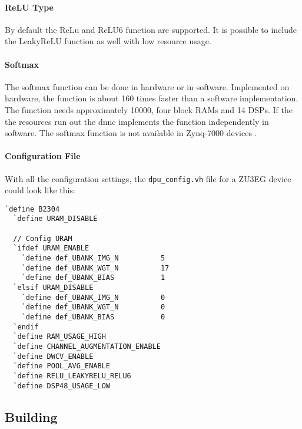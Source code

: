 \paragraph{ReLU Type}
By default the ReLu and ReLU6 function are supported.
It is possible to include the LeakyReLU function as well with low resource usage.

\paragraph{Softmax}
The softmax function can be done in hardware or in software.
Implemented on hardware, the function is about 160 times faster than a software implementation.
The function needs approximately \SI{10000}{}, four block RAMs and 14 DSPs.
If the the resources run out the \acrlong{dnnc} implements the function independently in software.
The softmax function is not available in Zynq-7000 devices \cite{dpu_product_guide}. 

\paragraph{Configuration File}
With all the configuration settings, the \texttt{dpu\_config.vh} file for a ZU3EG device could look like this:
\begin{lstlisting}[style=bash, caption={Configure \acrshort{dpu}}, label=lst:config_dpu]
  `define B2304
  `define URAM_DISABLE 

  // Config URAM
  `ifdef URAM_ENABLE
    `define def_UBANK_IMG_N          5
    `define def_UBANK_WGT_N          17
    `define def_UBANK_BIAS           1
  `elsif URAM_DISABLE
    `define def_UBANK_IMG_N          0
    `define def_UBANK_WGT_N          0
    `define def_UBANK_BIAS           0
  `endif
  `define RAM_USAGE_HIGH
  `define CHANNEL_AUGMENTATION_ENABLE
  `define DWCV_ENABLE
  `define POOL_AVG_ENABLE
  `define RELU_LEAKYRELU_RELU6
  `define DSP48_USAGE_LOW
\end{lstlisting}

\subsection{Building}
\label{subsec:embedded_platform:dpu:building}

